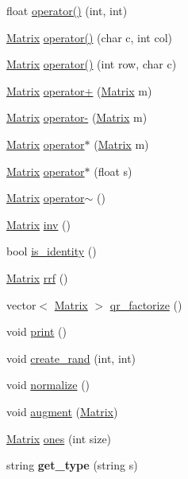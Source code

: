 \begin{DoxyCompactItemize}
\item 
float \hyperlink{classMatrix_a7cfbee0a259ddd270b2dce9dcccd1c1f}{operator()} (int, int)
\item 
\hyperlink{classMatrix}{Matrix} \hyperlink{classMatrix_a1b3509cd7326747a64593f02e0928073}{operator()} (char c, int col)
\item 
\hyperlink{classMatrix}{Matrix} \hyperlink{classMatrix_adb1820ca9023dd15f2d1da53d3f958dc}{operator()} (int row, char c)
\item 
\hyperlink{classMatrix}{Matrix} \hyperlink{classMatrix_a0dbbe5a4d7882f3fdbc59f1eba0e0ee2}{operator+} (\hyperlink{classMatrix}{Matrix} m)
\item 
\hyperlink{classMatrix}{Matrix} \hyperlink{classMatrix_a2aabf841a4302d528f8b102c0800a263}{operator-\/} (\hyperlink{classMatrix}{Matrix} m)
\item 
\hyperlink{classMatrix}{Matrix} \hyperlink{classMatrix_a5e36ae40c3b2863ffd80154a9b0c3012}{operator$\ast$} (\hyperlink{classMatrix}{Matrix} m)
\item 
\hyperlink{classMatrix}{Matrix} \hyperlink{classMatrix_a2054a88f24c32d711492431afd11a5cf}{operator$\ast$} (float s)
\item 
\hyperlink{classMatrix}{Matrix} \hyperlink{classMatrix_aff3fd507bacd00a00d0afa93d134bcd8}{operator$\sim$} ()
\item 
\hyperlink{classMatrix}{Matrix} \hyperlink{classMatrix_a7611488b98f9c291c86cb2ea47b1b56a}{inv} ()
\item 
bool \hyperlink{classMatrix_aeffea08696edf6d19b8b387e8f51b060}{is\-\_\-identity} ()
\item 
\hyperlink{classMatrix}{Matrix} \hyperlink{classMatrix_af3fa02d37acad394314032e0137d09a3}{rrf} ()
\item 
vector$<$ \hyperlink{classMatrix}{Matrix} $>$ \hyperlink{classMatrix_a80f03495bcd57c2f4c3ae7547c41850c}{qr\-\_\-factorize} ()
\item 
void \hyperlink{classMatrix_a99ba97122b8fdd54e95290caf80fc8e2}{print} ()
\item 
void \hyperlink{classMatrix_a3de72fdeb6f399497882a8f775b29460}{create\-\_\-rand} (int, int)
\item 
void \hyperlink{classMatrix_a00ff4e77d40160c2d3c1f7082abff2c6}{normalize} ()
\item 
void \hyperlink{classMatrix_aeea86d1b9f23af32d881438b369f7994}{augment} (\hyperlink{classMatrix}{Matrix})
\item 
\hyperlink{classMatrix}{Matrix} \hyperlink{classMatrix_a88e35d98ec8d1d26c6a39cb07f1d4ea4}{ones} (int size)
\item 
\hypertarget{classMatrix_abe40aae47d83742914e556cbd436345e}{string {\bfseries get\-\_\-type} (string s)}\label{classMatrix_abe40aae47d83742914e556cbd436345e}


\end{DoxyCompactItemize}
